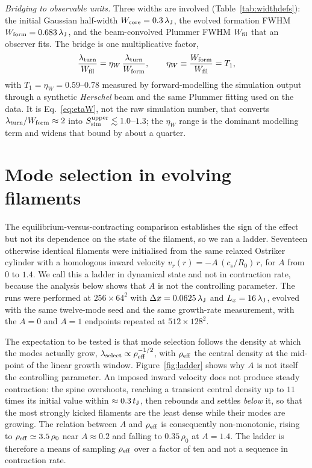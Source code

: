 \documentclass[usenatbib,twoside,twocolumn]{mnras}
\begin{document}
\emph{Bridging to observable units.} Three widths are involved (Table~\ref{tab:widthdefs}): the initial Gaussian half-width $W_{\rm core}=0.3\,\lambda_{\rm J}$, the evolved formation FWHM $W_{\rm form}=0.683\,\lambda_{\rm J}$, and the beam-convolved Plummer FWHM $W_{\rm fil}$ that an observer fits. The bridge is one multiplicative factor,
\begin{equation}
\frac{\lambda_{\rm turn}}{W_{\rm fil}}=\eta_W\,\frac{\lambda_{\rm turn}}{W_{\rm form}},
\qquad \eta_W\equiv\frac{W_{\rm form}}{W_{\rm fil}}=T_1,
\label{eq:etaW}
\end{equation}
with $T_1=\eta_W=0.59$--$0.78$ measured by forward-modelling the simulation output through a synthetic \textit{Herschel} beam and the same Plummer fitting used on the data. It is Eq.~\ref{eq:etaW}, not the raw simulation number, that converts $\lambda_{\rm turn}/W_{\rm form}\approx2$ into $S_{\rm sim}^{\rm upper}\lesssim1.0$--$1.3$; the $\eta_W$ range is the dominant modelling term and widens that bound by about a quarter.




\section{Mode selection in evolving filaments}
\label{sec:ladder}


The equilibrium-versus-contracting comparison establishes the sign of the effect but not its dependence on the state of the filament, so we ran a ladder. Seventeen otherwise identical filaments were initialised from the same relaxed Ostriker cylinder with a homologous inward velocity $v_r(r)=-A\,(c_s/R_0)\,r$, for $A$ from $0$ to $1.4$. We call this a ladder in dynamical state and not in contraction rate, because the analysis below shows that $A$ is not the controlling parameter. The runs were performed at $256\times64^2$ with $\Delta x=0.0625\,\lambda_{\rm J}$ and $L_x=16\,\lambda_{\rm J}$, evolved with the same twelve-mode seed and the same growth-rate measurement, with the $A=0$ and $A=1$ endpoints repeated at $512\times128^2$.

The expectation to be tested is that mode selection follows the density at which the modes actually grow, $\lambda_{\rm select}\propto\rho_{\rm eff}^{-1/2}$, with $\rho_{\rm eff}$ the central density at the mid-point of the linear growth window. Figure~\ref{fig:ladder} shows why $A$ is not itself the controlling parameter. An imposed inward velocity does not produce steady contraction: the spine overshoots, reaching a transient central density up to $11$ times its initial value within $\approx0.3\,t_{\rm J}$, then rebounds and settles \emph{below} it, so that the most strongly kicked filaments are the least dense while their modes are growing. The relation between $A$ and $\rho_{\rm eff}$ is consequently non-monotonic, rising to $\rho_{\rm eff}\simeq3.5\,\rho_0$ near $A\approx0.2$ and falling to $0.35\,\rho_0$ at $A=1.4$. The ladder is therefore a means of sampling $\rho_{\rm eff}$ over a factor of ten and not a sequence in contraction rate.
\end{document}
